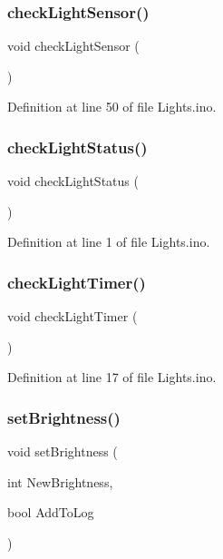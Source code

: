 \subsubsection{\texorpdfstring{checkLightSensor()}{checkLightSensor()}}
{\footnotesize\ttfamily void check\+Light\+Sensor (\begin{DoxyParamCaption}{ }\end{DoxyParamCaption})}



Definition at line 50 of file Lights.\+ino.

\mbox{\label{_lights_8ino_ab05125e73b9f49ea49ab69c9d76b6cd6}} 
\subsubsection{\texorpdfstring{checkLightStatus()}{checkLightStatus()}}
{\footnotesize\ttfamily void check\+Light\+Status (\begin{DoxyParamCaption}{ }\end{DoxyParamCaption})}



Definition at line 1 of file Lights.\+ino.

\mbox{\label{_lights_8ino_a76c1c1e7fa1dc6cea6562fc6cc852b76}} 
\subsubsection{\texorpdfstring{checkLightTimer()}{checkLightTimer()}}
{\footnotesize\ttfamily void check\+Light\+Timer (\begin{DoxyParamCaption}{ }\end{DoxyParamCaption})}



Definition at line 17 of file Lights.\+ino.

\mbox{\label{_lights_8ino_a81dbf7c6038727c457cffdc631f93231}} 
\subsubsection{\texorpdfstring{setBrightness()}{setBrightness()}}
{\footnotesize\ttfamily void set\+Brightness (\begin{DoxyParamCaption}\item[{int}]{New\+Brightness,  }\item[{bool}]{Add\+To\+Log }\end{DoxyParamCaption})}



